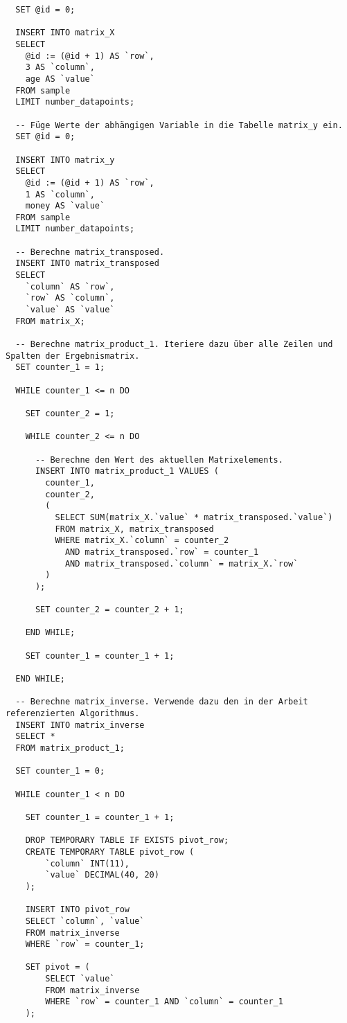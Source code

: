 \begin{verbatim}
  SET @id = 0;

  INSERT INTO matrix_X
  SELECT
    @id := (@id + 1) AS `row`,
    3 AS `column`,
    age AS `value`
  FROM sample
  LIMIT number_datapoints;

  -- Füge Werte der abhängigen Variable in die Tabelle matrix_y ein.
  SET @id = 0;

  INSERT INTO matrix_y
  SELECT
    @id := (@id + 1) AS `row`,
    1 AS `column`,
    money AS `value`
  FROM sample
  LIMIT number_datapoints;

  -- Berechne matrix_transposed.
  INSERT INTO matrix_transposed
  SELECT
    `column` AS `row`,
    `row` AS `column`,
    `value` AS `value`
  FROM matrix_X;

  -- Berechne matrix_product_1. Iteriere dazu über alle Zeilen und Spalten der Ergebnismatrix.
  SET counter_1 = 1;

  WHILE counter_1 <= n DO

    SET counter_2 = 1;

    WHILE counter_2 <= n DO

      -- Berechne den Wert des aktuellen Matrixelements.
      INSERT INTO matrix_product_1 VALUES (
        counter_1,
        counter_2,
        (
          SELECT SUM(matrix_X.`value` * matrix_transposed.`value`)
          FROM matrix_X, matrix_transposed
          WHERE matrix_X.`column` = counter_2
            AND matrix_transposed.`row` = counter_1
            AND matrix_transposed.`column` = matrix_X.`row`
        )
      );

      SET counter_2 = counter_2 + 1;

    END WHILE;

    SET counter_1 = counter_1 + 1;

  END WHILE;

  -- Berechne matrix_inverse. Verwende dazu den in der Arbeit referenzierten Algorithmus.
  INSERT INTO matrix_inverse
  SELECT *
  FROM matrix_product_1;

  SET counter_1 = 0;

  WHILE counter_1 < n DO

    SET counter_1 = counter_1 + 1;

    DROP TEMPORARY TABLE IF EXISTS pivot_row;
    CREATE TEMPORARY TABLE pivot_row (
        `column` INT(11),
        `value` DECIMAL(40, 20)
    );

    INSERT INTO pivot_row
    SELECT `column`, `value`
    FROM matrix_inverse
    WHERE `row` = counter_1;

    SET pivot = (
        SELECT `value`
        FROM matrix_inverse
        WHERE `row` = counter_1 AND `column` = counter_1
    );


\end{verbatim}
